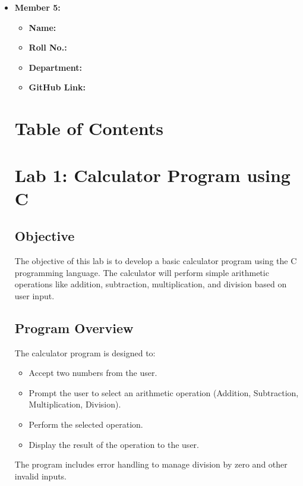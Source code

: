\documentclass[a4paper,15pt]{article}
\begin{document}
\begin{itemize}[leftmargin=1.5cm]
    \item \textbf{Member 5:} 
    \begin{itemize}[leftmargin=1.5cm]
        \item \textbf{Name: } 
        \item \textbf{Roll No.: } 
        \item \textbf{Department: } 
        \item \textbf{GitHub Link:} \url{}
\end{itemize}

\vspace{1cm}

\section*{Table of Contents}
\tableofcontents

\vspace{1cm}

\newpage

\section{Lab 1: Calculator Program using C}

\subsection{Objective}
The objective of this lab is to develop a basic calculator program using the C programming language. The calculator will perform simple arithmetic operations like addition, subtraction, multiplication, and division based on user input.

\subsection{Program Overview}
The calculator program is designed to:
\begin{itemize}
    \item Accept two numbers from the user.
    \item Prompt the user to select an arithmetic operation (Addition, Subtraction, Multiplication, Division).
    \item Perform the selected operation.
    \item Display the result of the operation to the user.
\end{itemize}

The program includes error handling to manage division by zero and other invalid inputs.


\end{itemize}
\end{document}
